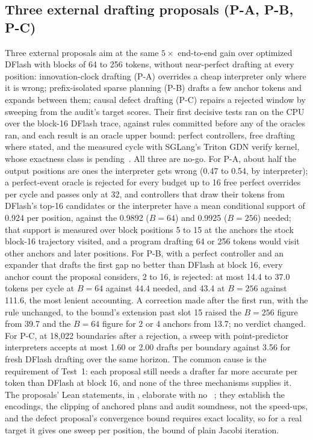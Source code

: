 \subsection{Three external drafting proposals (P-A, P-B, P-C)}\label{app:external-drafting}
Three external proposals aim at the same $5\times$ end-to-end gain over optimized DFlash with blocks of 64 to 256 tokens, without near-perfect drafting at every position: innovation-clock drafting (P-A) overrides a cheap interpreter only where it is wrong; prefix-isolated sparse planning (P-B) drafts a few anchor tokens and expands between them; causal defect drafting (P-C) repairs a rejected window by sweeping from the audit's target scores. Their first decisive tests ran on the CPU over the block-16 DFlash trace, against rules committed before any of the oracles ran, and each result is an oracle upper bound: perfect controllers, free drafting where stated, and the measured cycle with SGLang's Triton GDN verify kernel, whose exactness class is pending~. All three are no-go. For P-A, about half the output positions are ones the interpreter gets wrong (0.47 to 0.54, by interpreter); a perfect-event oracle is rejected for every budget up to 16 free perfect overrides per cycle and passes only at 32, and controllers that draw their tokens from DFlash's top-16 candidates or the interpreter have a mean conditional support of 0.924 per position, against the 0.9892 ($B=64$) and 0.9925 ($B=256$) needed; that support is measured over block positions 5 to 15 at the anchors the stock block-16 trajectory visited, and a program drafting 64 or 256 tokens would visit other anchors and later positions. For P-B, with a perfect controller and an expander that drafts the first gap no better than DFlash at block 16, every anchor count the proposal considers, 2 to 16, is rejected: at most 14.4 to 37.0 tokens per cycle at $B=64$ against 44.4 needed, and 43.4 at $B=256$ against 111.6, the most lenient accounting. A correction made after the first run, with the rule unchanged, to the bound's extension past slot 15 raised the $B=256$ figure from 39.7 and the $B=64$ figure for 2 or 4 anchors from 13.7; no verdict changed. For P-C, at 18,022 boundaries after a rejection, a sweep with point-predictor interpreters accepts at most 1.60 or 2.00 drafts per boundary against 3.56 for fresh DFlash drafting over the same horizon. The common cause is the requirement of Test~1: each proposal still needs a drafter far more accurate per token than DFlash at block 16, and none of the three mechanisms supplies it. The proposals' Lean statements, in , elaborate with no ~; they establish the encodings, the clipping of anchored plans and audit soundness, not the speed-ups, and the defect proposal's convergence bound requires exact locality, so for a real target it gives one sweep per position, the bound of plain Jacobi iteration.

